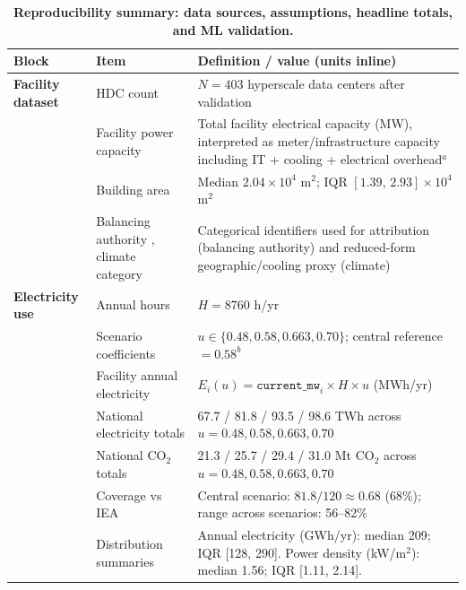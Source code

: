 \documentclass[12pt]{article}
\begin{document}
\begin{table}
\scriptsize
\setlength{\tabcolsep}{3pt}
\renewcommand{\arraystretch}{0.92}
\centering
\caption{\textbf{Reproducibility summary: data sources, assumptions, headline totals, and ML validation.}}
\label{tab:repro_summary_compact}

\begin{tabular}{p{3.2cm} p{4.2cm} p{14.2cm}}
\toprule
\textbf{Block} & \textbf{Item} & \textbf{Definition / value (units inline)} \\
\midrule

\textbf{Facility dataset} &
HDC count &
$N=403$ hyperscale data centers after validation \\

&
Facility power capacity& 
Total facility electrical capacity (MW), interpreted as meter/infrastructure capacity including IT + cooling + electrical overhead$^{a}$ \\

&
Building area &
Median $2.04\times 10^{4}$ m$^2$; IQR $[1.39,\,2.93]\times 10^{4}$ m$^2$ \\

&
Balancing authority , climate category &
Categorical identifiers used for attribution (balancing authority) and reduced-form geographic/cooling proxy (climate) \\

\midrule
\textbf{Electricity use} &
Annual hours &
$H=8760$ h/yr \\

&
Scenario coefficients & $u \in \{0.48, 0.58, 0.663, 0.70\}$; central reference $= 0.58^{b}$\\

&
Facility annual electricity &
$E_i(u)=\texttt{current\_mw}_i \times H \times u$ (MWh/yr) \\

&
National electricity totals & 67.7 / 81.8 / 93.5 / 98.6 TWh across $u = 0.48, 0.58, 0.663, 0.70$\\

&
National CO$_2$ totals & 21.3 / 25.7 / 29.4 / 31.0 Mt CO$_2$ across $u = 0.48, 0.58, 0.663, 0.70$\\

&
Coverage vs IEA & Central scenario: $81.8/120 \approx 0.68$ (68\%); range across scenarios: 56--82\%\\

&
Distribution summaries &
Annual electricity (GWh/yr): median 209; IQR [128, 290]. Power density (kW/m$^2$): median 1.56; IQR [1.11, 2.14]. \\


\end{tabular}
\end{table}
\end{document}
